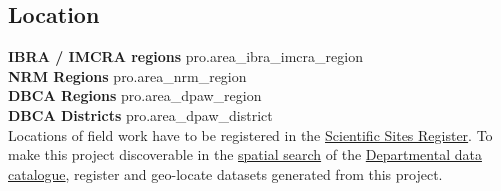 \subsection*{Location}
\textbf{IBRA / IMCRA regions }{{ pro.area_ibra_imcra_region }}\\
\textbf{NRM Regions }{{ pro.area_nrm_region }}\\
\textbf{DBCA Regions }{{ pro.area_dpaw_region }}\\
\textbf{DBCA Districts }{{ pro.area_dpaw_district }}\\
Locations of field work have to be registered in the
\href{http://scientificsites.dpaw.wa.gov.au/}{Scientific Sites Register}.
To make this project discoverable in the
\href{http://internal-data.dpaw.wa.gov.au/dataset?ext_bbox=110\%2C-36\%2C130\%2C-9}{spatial search} of the
\href{http://internal-data.dpaw.wa.gov.au/}{Departmental data catalogue},
register and geo-locate datasets generated from this project.

